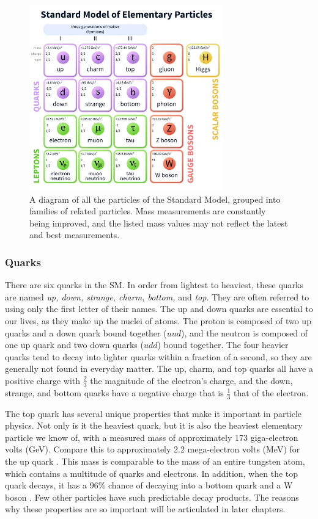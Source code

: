 \begin{figure}[h]
  \centering
  \includegraphics[width=0.75\textwidth]{figures/standard-model-light.pdf}
  \caption%
  {A diagram of all the particles of the Standard Model, grouped into
  families of related particles. Mass measurements are constantly
  being improved, and the listed mass values may not reflect the latest and
  best measurements.}
  \label{fig:standardmodel}
\end{figure}

\subsubsection*{Quarks}
There are six quarks in the SM. In order from lightest to heaviest,
these quarks are named \emph{up, down, strange, charm, bottom,} and
\emph{top}. They are often referred to using only the first letter of
their names. The up and down quarks are essential to our lives, as
they make up the nuclei of atoms. The proton is composed of two up
quarks and a down quark bound together ($uud$), and the neutron is composed of one up
quark and two down quarks ($udd$) bound together. The four heavier
quarks tend to decay into lighter quarks within a fraction of a
second, so they are generally not found in everyday matter. The up,
charm, and top quarks all have a positive charge with $\frac{2}{3}$ the
magnitude of the electron's charge, and the down, strange, and bottom
quarks have a negative charge that is $\frac{1}{3}$ that of the electron.

The top quark has several unique properties that make it important
in particle physics. Not only is
it the heaviest quark, but it is also the heaviest elementary particle
we know of, with a measured mass of approximately 173 giga-electron
volts (GeV). Compare this to approximately 2.2 mega-electron volts
(MeV) for the up quark \cite{pdg}. This mass is comparable to the mass
of an entire tungsten atom, which contains a multitude of quarks and electrons.
In addition, when the top quark decays, it has a 96\% chance of
decaying into a bottom quark and a W boson \cite{pdg}. Few other
particles have such predictable decay products. The reasons why these
properties are so important will be articulated in later chapters. %

